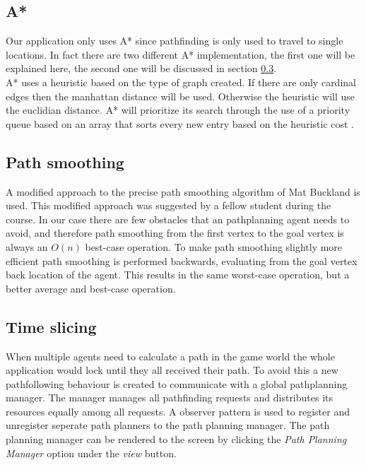 \documentclass[10pt]{extarticle} %
\begin{document}
   \subsection {A*}\label{astar}
  Our application only uses A* since pathfinding is only used to travel to single locations. In fact there are two different A* implementation, the first one will be explained here, the second one will be discussed in section \ref{tsastar}.\\
  A* uses a heuristic based on the type of graph created. If there are only cardinal edges then the manhattan distance will be used. Otherwise the heuristic will use the euclidian distance. A* will prioritize its search through the use of a priority queue based on an array that sorts every new entry based on the heuristic cost \cite{shpq}. 
   \subsection {Path smoothing}
A modified approach to the precise path smoothing algorithm of Mat Buckland \cite{pgaie} is used. This modified approach was suggested by a fellow student during the course. In our case there are few obstacles that an pathplanning agent needs to avoid, and therefore path smoothing from the first vertex to the goal vertex is always an \(O(n)\) best-case operation. To make path smoothing slightly more efficient path smoothing is performed backwards, evaluating from the goal vertex back location of the agent. This results in the same worst-case operation, but a better average and best-case operation.
   \subsection {Time slicing} \label{tsastar}
  When multiple agents need to calculate a path in the game world the whole application would lock until they all received their path. To avoid this a new pathfollowing behaviour is created to communicate with a global pathplanning manager. The manager manages all pathfinding requests and distributes its resources equally among all requests. A observer pattern is used to register and unregister seperate path planners to the path planning manager.
   The path planning manager can be rendered to the screen by clicking the \emph{Path Planning Manager} option under the \emph{view} button.
   \newpage   
\end{document}
